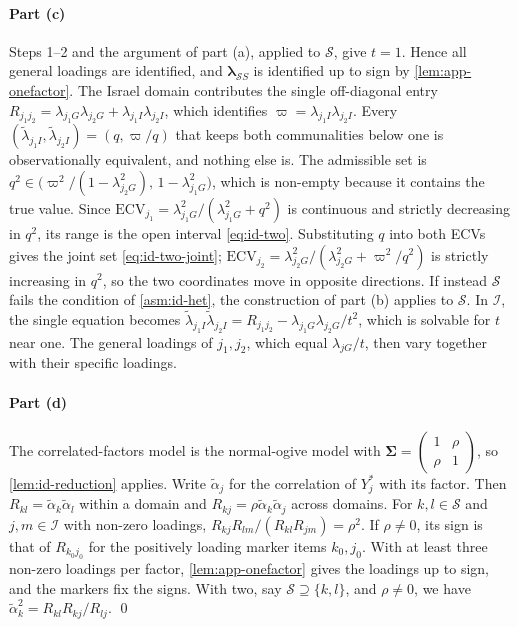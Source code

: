 \paragraph{Part (c)}
Steps 1--2 and the argument of part (a), applied to $\mathcal S$, give $t=1$. Hence all general loadings are identified, and $\bm\lambda_{\mathcal SS}$ is identified up to sign by \cref{lem:app-onefactor}. The Israel domain contributes the single off-diagonal entry $R_{j_1j_2}=\lambda_{j_1G}\lambda_{j_2G}+\lambda_{j_1I}\lambda_{j_2I}$, which identifies $\varpi=\lambda_{j_1I}\lambda_{j_2I}$. Every $(\tilde\lambda_{j_1I},\tilde\lambda_{j_2I})=(q,\varpi/q)$ that keeps both communalities below one is observationally equivalent, and nothing else is. The admissible set is $q^2\in\bigl(\varpi^2/(1-\lambda_{j_2G}^2),\,1-\lambda_{j_1G}^2\bigr)$, which is non-empty because it contains the true value. Since $\mathrm{ECV}_{j_1}=\lambda_{j_1G}^2/(\lambda_{j_1G}^2+q^2)$ is continuous and strictly decreasing in $q^2$, its range is the open interval \eqref{eq:id-two}. Substituting $q$ into both ECVs gives the joint set \eqref{eq:id-two-joint}; $\mathrm{ECV}_{j_2}=\lambda_{j_2G}^2/(\lambda_{j_2G}^2+\varpi^2/q^2)$ is strictly increasing in $q^2$, so the two coordinates move in opposite directions. If instead $\mathcal S$ fails the condition of \cref{asm:id-het}, the construction of part (b) applies to $\mathcal S$. In $\mathcal I$, the single equation becomes $\tilde\lambda_{j_1I}\tilde\lambda_{j_2I}=R_{j_1j_2}-\lambda_{j_1G}\lambda_{j_2G}/t^2$, which is solvable for $t$ near one. The general loadings of $j_1,j_2$, which equal $\lambda_{jG}/t$, then vary together with their specific loadings.

\paragraph{Part (d)}
The correlated-factors model is the normal-ogive model with $\bm\Sigma=\left(\begin{smallmatrix}1&\rho\\ \rho&1\end{smallmatrix}\right)$, so \cref{lem:id-reduction} applies. Write $\tilde\alpha_j$ for the correlation of $Y^*_j$ with its factor. Then $R_{kl}=\tilde\alpha_k\tilde\alpha_l$ within a domain and $R_{kj}=\rho\tilde\alpha_k\tilde\alpha_j$ across domains. For $k,l\in\mathcal S$ and $j,m\in\mathcal I$ with non-zero loadings, $R_{kj}R_{lm}/(R_{kl}R_{jm})=\rho^2$. If $\rho\neq0$, its sign is that of $R_{k_0j_0}$ for the positively loading marker items $k_0,j_0$. With at least three non-zero loadings per factor, \cref{lem:app-onefactor} gives the loadings up to sign, and the markers fix the signs. With two, say $\mathcal S\supseteq\{k,l\}$, and $\rho\neq0$, we have $\tilde\alpha_k^2=R_{kl}R_{kj}/R_{lj}$. \qed

